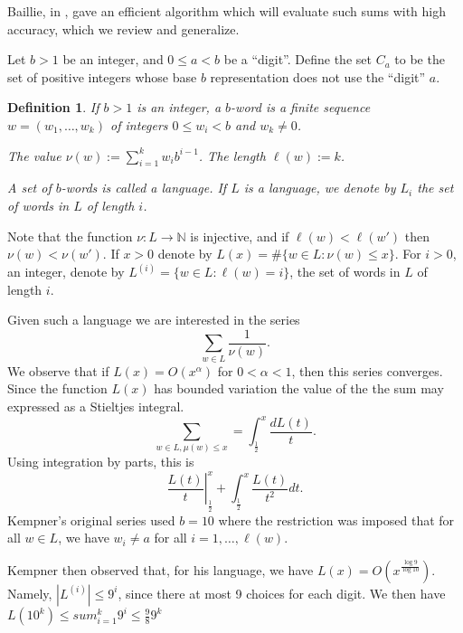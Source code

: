 \documentclass{article}
\newtheorem{definition}[section]{Definition}
\newcommand{\NN}{\mathbb{N}}
\begin{document}
Baillie, in \cite{baillie1979sums}, gave an efficient algorithm which
will evaluate such sums with high accuracy, which we review and generalize.

Let $b > 1$ be an integer, and $0 \le a < b$ be a ``digit''. Define
the set $C_a$ to be the set of positive integers whose base $b$
representation does not use the ``digit'' $a$.

\begin{definition}
  If $b > 1$ is an integer, a \emph{$b$-word} is a finite sequence
  $w = (w_1, \dots, w_k)$ of integers $0 \le w_i < b$ and $w_k \ne 0$.

  The \emph{value} $\nu(w) := \sum_{i=1}^k w_i b^{i-1}$. The \emph{length}
  $\ell(w) := k$.
  
  A set of $b$-words is called a \emph{language}. If $L$ is a
  language, we denote by $L_i$ the set of words in $L$ of length $i$.

\end{definition}

Note that the function $\nu: L \rightarrow \NN$ is injective, and if
$\ell(w) < \ell(w')$ then $\nu(w) < \nu(w')$. If $x>0$ denote by $L(x)
= \#\{w \in L : \nu(w) \le x\}$. For $i > 0$, an integer,  denote by
$L^{(i)} = \{ w \in L : \ell(w) = i\}$, the set of words in $L$ of
length $i$.

Given such a language we are interested in the series
\begin{displaymath}
  \sum_{w \in L} \frac{1}{\nu(w)}.
\end{displaymath}
We observe that if $L(x) = O(x^\alpha)$ for $0 < \alpha < 1$, then
this series converges. Since the function $L(x)$ has bounded variation
the value of the the sum may expressed as a Stieltjes integral.
\begin{equation}
  \label{eq:stieltjes}
  \sum_{w \in L, \mu(w) \le x} = \int_{\frac{1}{2}}^x\frac{d L(t)}{t}.
\end{equation}
Using integration by parts, this is
\begin{equation}
  \label{eq:parts}
  \left. \frac{L(t)}{t} \right|_{\frac{1}{2}}^x + \int_{\frac{1}{2}}^x
  \frac{L(t)}{t^2} dt.
\end{equation}
Kempner's original series used $b=10$ where the restriction was
imposed that for all $w \in L$, we have $w_i \ne a$ for all $i=1,
\dots, \ell(w)$.

Kempner then observed that, for his language, we have $L(x) =
O(x^{\frac{\log 9}{\log 10}})$. Namely, $|L^{(i)}| \le 9^i$, since
there at most 9 choices for each digit. We then have $L(10^k) \le
sum_{i=1}^k 9^i \le \frac{9}{8} 9^k$
\end{document}
